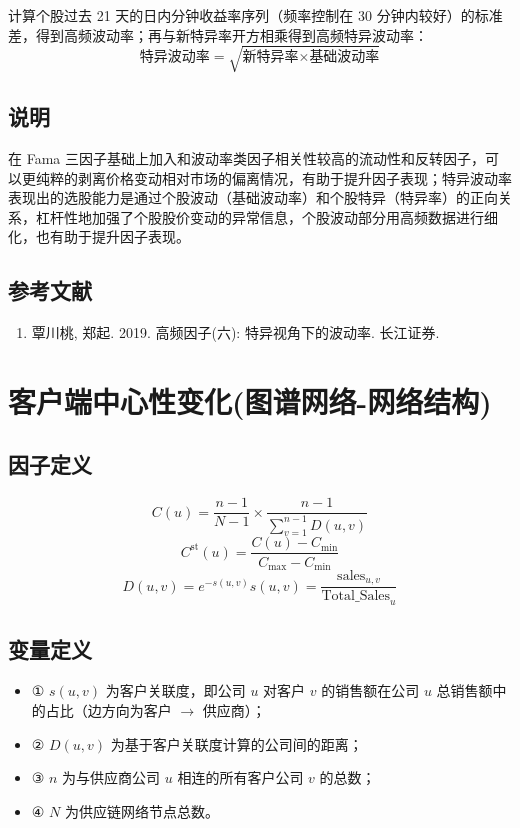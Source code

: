 \documentclass{article}
\begin{document}
计算个股过去 21 天的日内分钟收益率序列（频率控制在 30 分钟内较好）的标准差，得到高频波动率；再与新特异率开方相乘得到高频特异波动率：
\begin{equation}
    \text{特异波动率} = \sqrt{\text{新特异率} \times \text{基础波动率}}
\end{equation}

\subsection{说明}
在 Fama 三因子基础上加入和波动率类因子相关性较高的流动性和反转因子，可以更纯粹的剥离价格变动相对市场的偏离情况，有助于提升因子表现；特异波动率表现出的选股能力是通过个股波动（基础波动率）和个股特异（特异率）的正向关系，杠杆性地加强了个股股价变动的异常信息，个股波动部分用高频数据进行细化，也有助于提升因子表现。

\subsection{参考文献}
\begin{enumerate}
    \item 覃川桃, 郑起. 2019. 高频因子(六): 特异视角下的波动率. 长江证券.
\end{enumerate}

\section{客户端中心性变化(图谱网络-网络结构)}

\subsection{因子定义}

\begin{equation}
    C(u) = \frac{n-1}{N-1} \times \frac{n-1}{\sum_{v=1}^{n-1} D(u, v)}
\end{equation}
\begin{equation}
    C^{\mathrm{st}}(u) = \frac{C(u) - C_{\mathrm{min}}}{C_{\mathrm{max}} - C_{\mathrm{min}}}
\end{equation}
\begin{equation}
    D(u, v) = e^{-s(u,v)} s(u, v) = \frac{\mathrm{sales}_{u,v}}{\mathrm{Total\_Sales}_u}
\end{equation}

\subsection{变量定义}
\begin{itemize}
    \item ① \( s(u, v) \) 为客户关联度，即公司 \( u \) 对客户 \( v \) 的销售额在公司 \( u \) 总销售额中的占比（边方向为客户 $\rightarrow$ 供应商）；
    \item ② \( D(u, v) \) 为基于客户关联度计算的公司间的距离；
    \item ③ \( n \) 为与供应商公司 \( u \) 相连的所有客户公司 \( v \) 的总数；
    \item ④ \( N \) 为供应链网络节点总数。
\end{itemize}
\end{document}
